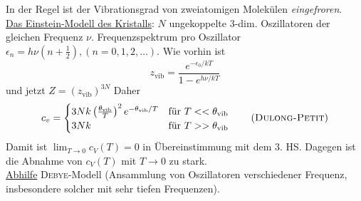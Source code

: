 \begin{enumerate}[A)]
    In der Regel ist der Vibrationsgrad von zweiatomigen Molekülen \emph{eingefroren}. \\[\baselineskip]
    \underline{Das Einstein-Modell des Kristalls}: $N$ ungekoppelte 3-dim. Oszillatoren der gleichen Frequenz $\nu$.
    Frequenzspektrum pro Oszillator $\epsilon_n = h \nu \left( n + \frac{1}{2} \right), (n=0, 1, 2, \ldots)$. Wie vorhin ist
    \begin{equation}
        z_\text{vib} = \frac{e^{-\epsilon_0 / kT}}{1-e^{h \nu / kT}}
    \end{equation}
    und jetzt $Z = \left( z_\text{vib} \right)^{3N}$
    Daher
    \begin{equation}
        c_v =
        \begin{cases}
            3 N k \left( \frac{\theta_\text{vib}}{T} \right)^2 e^{- \theta_\text{vib} / T} & \text{für } T << \theta_\text{vib} \\
            3 N k & \text{für } T >> \theta_\text{vib}
        \end{cases}
        \qquad \left( \text{\textsc{Dulong-Petit}} \right) 
    \end{equation}
    Damit ist $\lim_{T \to 0} c_V(T) = 0$ in Übereinstimmung mit dem 3. HS. Dagegen ist die Abnahme von $c_V(T)$ mit $T \to 0$ zu stark.\\
    \underline{Abhilfe} \textsc{Debye}-Modell (Ansammlung von Oszillatoren verschiedener Frequenz, insbesondere solcher mit sehr tiefen Frequenzen).
\end{enumerate}

